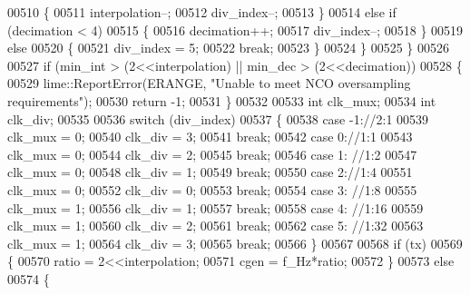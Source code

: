 \begin{DoxyCode}
00510            \{
00511              interpolation--;
00512              div\_index--;
00513            \}
00514            \textcolor{keywordflow}{else} \textcolor{keywordflow}{if} (decimation < 4)
00515            \{
00516              decimation++;
00517              div\_index--;
00518            \}
00519            \textcolor{keywordflow}{else}
00520            \{
00521                div\_index = 5;
00522                \textcolor{keywordflow}{break};
00523            \}
00524         \}
00525     \}
00526 
00527     \textcolor{keywordflow}{if} (min\_int > (2<<interpolation) || min\_dec > (2<<decimation))
00528     \{
00529         lime::ReportError(ERANGE, \textcolor{stringliteral}{"Unable to meet NCO oversampling requirements"});
00530         \textcolor{keywordflow}{return} -1;
00531     \}
00532 
00533     \textcolor{keywordtype}{int} clk\_mux;
00534     \textcolor{keywordtype}{int} clk\_div;
00535 
00536     \textcolor{keywordflow}{switch} (div\_index)
00537     \{
00538         \textcolor{keywordflow}{case} -1:\textcolor{comment}{//2:1}
00539                 clk\_mux = 0;
00540                 clk\_div = 3;
00541                 \textcolor{keywordflow}{break};
00542         \textcolor{keywordflow}{case} 0:\textcolor{comment}{//1:1}
00543                 clk\_mux = 0;
00544                 clk\_div = 2;
00545                 \textcolor{keywordflow}{break};
00546         \textcolor{keywordflow}{case} 1: \textcolor{comment}{//1:2}
00547                 clk\_mux = 0;
00548                 clk\_div = 1;
00549                 \textcolor{keywordflow}{break};
00550         \textcolor{keywordflow}{case} 2:\textcolor{comment}{//1:4}
00551                 clk\_mux = 0;
00552                 clk\_div = 0;
00553                 \textcolor{keywordflow}{break};
00554         \textcolor{keywordflow}{case} 3: \textcolor{comment}{//1:8}
00555                 clk\_mux = 1;
00556                 clk\_div = 1;
00557                 \textcolor{keywordflow}{break};
00558         \textcolor{keywordflow}{case} 4: \textcolor{comment}{//1:16}
00559                 clk\_mux = 1;
00560                 clk\_div = 2;
00561                 \textcolor{keywordflow}{break};
00562         \textcolor{keywordflow}{case} 5: \textcolor{comment}{//1:32}
00563                 clk\_mux = 1;
00564                 clk\_div = 3;
00565                 \textcolor{keywordflow}{break};
00566     \}
00567 
00568     \textcolor{keywordflow}{if} (tx)
00569     \{
00570         ratio = 2<<interpolation;
00571         cgen = f\_Hz*ratio;
00572     \}
00573     \textcolor{keywordflow}{else}
00574     \{

\end{DoxyCode}
